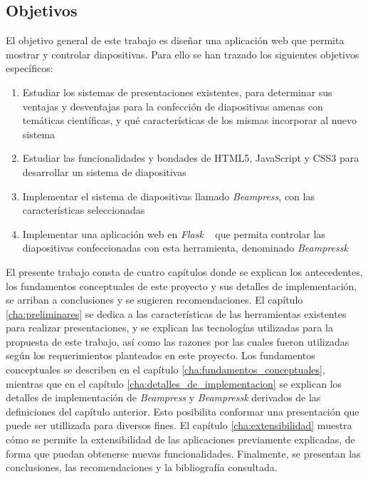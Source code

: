 \begin{introduction}
	\section*{Objetivos} %
	\label{sec:objetivos}

		El objetivo general de este trabajo es diseñar una aplicación web que permita mostrar y controlar diapositivas. Para ello se han trazado los siguientes objetivos específicos:

		\begin{enumerate}
			\item Estudiar los sistemas de presentaciones existentes, para determinar sus ventajas y desventajas para la confección de diapositivas amenas con temáticas científicas, y qué características de los mismas incorporar al nuevo sistema
			\item Estudiar las funcionalidades y bondades de HTML5, JavaScript y CSS3 para desarrollar un sistema de diapositivas
			\item Implementar el sistema de diapositivas llamado \textit{Beampress}, con las características seleccionadas
			\item Implementar una aplicación web en \textit{Flask} ~\cite{flask, flaskbook} que permita controlar las diapositivas confeccionadas con esta herramienta, denominado \textit{Beampressk}
		\end{enumerate}

		El presente trabajo consta de cuatro capítulos donde se explican los antecedentes, los fundamentos conceptuales de este proyecto y sus detalles de implementación, se arriban a conclusiones y se sugieren recomendaciones. El capítulo \ref{cha:preliminares} se dedica a las características de las herramientas existentes para realizar presentaciones, y se explican las tecnologías utilizadas para la propuesta de este trabajo, así como las razones por las cuales fueron utilizadas según los requerimientos planteados en este proyecto. Los fundamentos conceptuales se describen en el capítulo \ref{cha:fundamentos_conceptuales}, mientras que en el capítulo \ref{cha:detalles_de_implementacion} se explican los detalles de implementación de \textit{Beampress} y \textit{Beampressk} derivados de las definiciones del capítulo anterior. Esto posibilita conformar una presentación que puede ser utillizada para diversos fines. El capítulo \ref{cha:extensibilidad} muestra cómo se permite la extensibilidad de las aplicaciones previamente explicadas, de forma que puedan obtenerse nuevas funcionalidades. Finalmente, se presentan las conclusiones, las recomendaciones y la bibliografía consultada.





\end{introduction}




